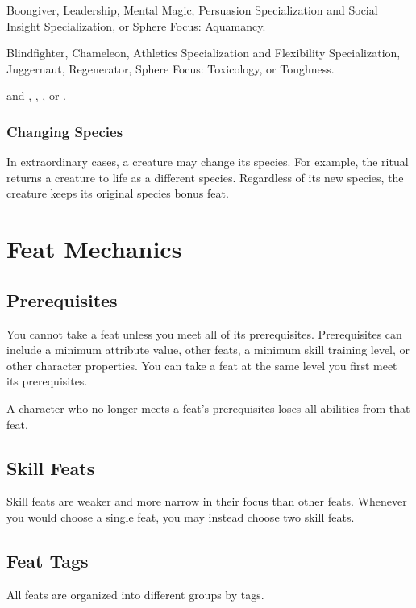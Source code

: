        Boongiver, Leadership, Mental Magic, Persuasion Specialization and Social Insight Specialization, or Sphere Focus: Aquamancy.

       Blindfighter, Chameleon, Athletics Specialization and Flexibility Specialization, Juggernaut, Regenerator, Sphere Focus: Toxicology, or Toughness.

        and , , , or .

    \subsubsection{Changing Species}
      In extraordinary cases, a creature may change its species.
      For example, the  ritual returns a creature to life as a different species.
      Regardless of its new species, the creature keeps its original species bonus feat.

\section{Feat Mechanics}

  \subsection{Prerequisites}
    You cannot take a feat unless you meet all of its prerequisites.
    Prerequisites can include a minimum attribute value, other feats, a minimum skill training level, or other character properties.
    You can take a feat at the same level you first meet its prerequisites.

    A character who no longer meets a feat's prerequisites loses all abilities from that feat.

  \subsection{Skill Feats}
    Skill feats are weaker and more narrow in their focus than other feats.
    Whenever you would choose a single feat, you may instead choose two skill feats.

  \subsection{Feat Tags}
    All feats are organized into different groups by tags.

